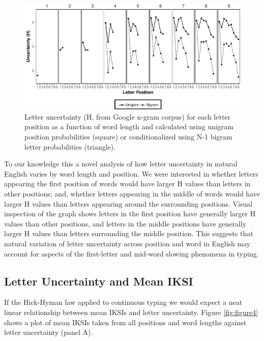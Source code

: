 \documentclass[,man,floatsintext]{apa6}
\begin{document}
\begin{figure}
\centering
\includegraphics{v2-manuscript_files/figure-latex/figure3-1.pdf}
\caption{\label{fig:figure3}Letter uncertainty (H, from Google n-gram corpus) for each letter position as a function of word length and calculated using unigram position probabilities (square) or conditionalized using N-1 bigram letter probabilities (triangle).}
\end{figure}



To our knowledge this a novel analysis of how letter uncertainty in natural English varies by word length and position. We were interested in whether letters appearing the first position of words would have larger H values than letters in other positions; and, whether letters appearing in the middle of words would have larger H values than letters appearing around the surrounding positions. Visual inspection of the graph shows letters in the first position have generally larger H values than other positions, and letters in the middle positions have generally larger H values than letters surrounding the middle position. This suggests that natural variation of letter uncertainty across position and word in English may account for aspects of the first-letter and mid-word slowing phenomena in typing.

\hypertarget{letter-uncertainty-and-mean-iksi}{%
\subsection{Letter Uncertainty and Mean IKSI}\label{letter-uncertainty-and-mean-iksi}}

If the Hick-Hyman law applied to continuous typing we would expect a neat linear relationship between mean IKSIs and letter uncertainty. Figure \ref{fig:figure4} shows a plot of mean IKSIs taken from all positions and word lengths against letter uncertainty (panel A).
\end{document}
